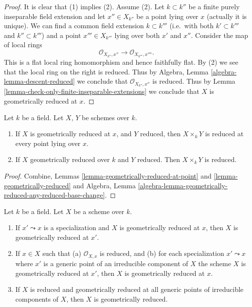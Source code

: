 \begin{proof}
It is clear that (1) implies (2). Assume (2).
Let $k \subset k''$ be a finite purely inseparable field extension
and let $x'' \in X_{k''}$ be a point lying over $x$ (actually it is
unique). We can find a common field extension $k \subset k'''$
(i.e.\ with both $k' \subset k'''$ and $k'' \subset k'''$) and a point
$x''' \in X_{k'''}$ lying over both $x'$ and $x''$.
Consider the map of local rings
$$
\mathcal{O}_{X_{k''}, x''} \longrightarrow \mathcal{O}_{X_{k'''}, x''''}.
$$
This is a flat local ring homomorphism and hence faithfully flat.
By (2) we see that the local ring on the right is reduced.
Thus by Algebra, Lemma \ref{algebra-lemma-descent-reduced}
we conclude that $\mathcal{O}_{X_{k''}, x''}$ is reduced.
Thus by Lemma \ref{lemma-check-only-finite-inseparable-extensions}
we conclude that $X$ is geometrically reduced at $x$.
\end{proof}

\begin{lemma}
\label{lemma-geometrically-reduced-any-base-change}
Let $k$ be a field.
Let $X$, $Y$ be schemes over $k$.
\begin{enumerate}
\item If $X$ is geometrically reduced at $x$, and $Y$ reduced,
then $X \times_k Y$ is reduced at every point lying over $x$.
\item If $X$ geometrically reduced over $k$ and $Y$ reduced.
Then $X \times_k Y$ is reduced.
\end{enumerate}
\end{lemma}

\begin{proof}
Combine, Lemmas \ref{lemma-geometrically-reduced-at-point}
and \ref{lemma-geometrically-reduced} and Algebra,
Lemma \ref{algebra-lemma-geometrically-reduced-any-reduced-base-change}.
\end{proof}

\begin{lemma}
\label{lemma-generic-points-geometrically-reduced}
Let $k$ be a field.
Let $X$ be a scheme over $k$.
\begin{enumerate}
\item If $x' \leadsto x$ is a specialization and $X$ is geometrically
reduced at $x$, then $X$ is geometrically reduced at $x'$.
\item If $x \in X$ such that (a) $\mathcal{O}_{X, x}$
is reduced, and (b) for each specialization $x' \leadsto x$ where
$x'$ is a generic point of an irreducible component of $X$ the
scheme $X$ is geometrically reduced at $x'$, then $X$ is geometrically
reduced at $x$.
\item If $X$ is reduced and geometrically reduced at all generic
points of irreducible components of $X$, then $X$ is geometrically
reduced.
\end{enumerate}
\end{lemma}

